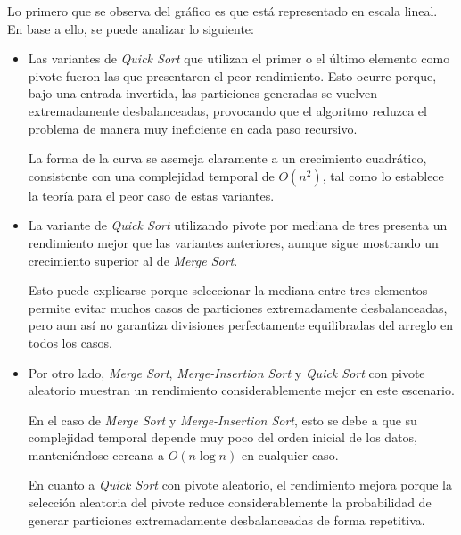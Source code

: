 Lo primero que se observa del gráfico es que está representado en escala lineal. \\

En base a ello, se puede analizar lo siguiente:


\begin{itemize}

    \item Las variantes de \textit{Quick Sort} que utilizan el primer o el último elemento como pivote fueron las que presentaron el peor rendimiento.  
          Esto ocurre porque, bajo una entrada invertida, las particiones generadas se vuelven extremadamente desbalanceadas, provocando que el algoritmo 
          reduzca el problema de manera muy ineficiente en cada paso recursivo.  

          La forma de la curva se asemeja claramente a un crecimiento cuadrático, consistente con una complejidad temporal de 
          $O(n^2)$, tal como lo establece la teoría para el peor caso de estas variantes.

    \item La variante de \textit{Quick Sort} utilizando pivote por mediana de tres presenta un rendimiento mejor que las variantes anteriores, aunque sigue 
          mostrando un crecimiento superior al de \textit{Merge Sort}.  

          Esto puede explicarse porque seleccionar la mediana entre tres elementos permite evitar muchos casos de particiones extremadamente 
          desbalanceadas, pero aun así no garantiza divisiones perfectamente equilibradas del arreglo en todos los casos.

    \item Por otro lado, \textit{Merge Sort}, \textit{Merge-Insertion Sort} y \textit{Quick Sort} con pivote aleatorio muestran un rendimiento 
          considerablemente mejor en este escenario.  

          En el caso de \textit{Merge Sort} y \textit{Merge-Insertion Sort}, esto se debe a que su complejidad temporal depende muy poco del orden 
          inicial de los datos, manteniéndose cercana a $O(n \log n)$ en cualquier caso.

          En cuanto a \textit{Quick Sort} con pivote aleatorio, el rendimiento mejora porque la selección aleatoria del pivote reduce considerablemente 
          la probabilidad de generar particiones extremadamente desbalanceadas de forma repetitiva.
\end{itemize}


